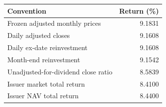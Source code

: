\begin{tabular}{@{}lr@{}}\toprule
Convention & Return (\%)\\\midrule
Frozen adjusted monthly prices & 9.1831\\
Daily adjusted closes & 9.1608\\
Daily ex-date reinvestment & 9.1608\\
Month-end reinvestment & 9.1542\\
Unadjusted-for-dividend close ratio & 8.5839\\
Issuer market total return & 8.4100\\
Issuer NAV total return & 8.4400\\
\bottomrule\end{tabular}
